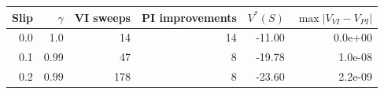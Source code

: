 \begin{tabular}{rrrrrr}
\toprule
Slip & $\gamma$ & VI sweeps & PI improvements & $V^*(S)$ & $\max|V_{VI}-V_{PI}|$ \\
\midrule
0.0 & 1.0 & 14 & 14 & -11.00 & 0.0e+00 \\
0.1 & 0.99 & 47 & 8 & -19.78 & 1.0e-08 \\
0.2 & 0.99 & 178 & 8 & -23.60 & 2.2e-09 \\
\bottomrule
\end{tabular}
